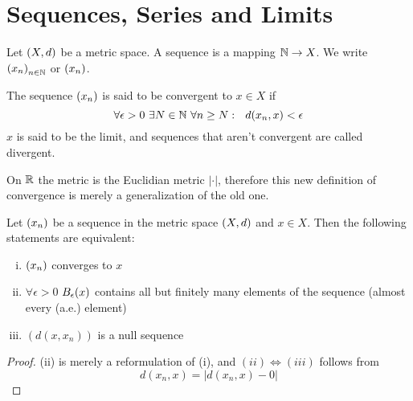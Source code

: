 \documentclass[../../script.tex] {subfiles}
\begin{document}
\section{Sequences, Series and Limits}

\begin{defi}
    Let $(X, d)$ be a metric space. A sequence is a mapping $\mathbb{N} \rightarrow X$. We write $\left(x_n\right)_{n \in \mathbb{N}}$ or $\left(x_n\right)$.

    The sequence $\left(x_n\right)$ is said to be convergent to $x \in X$ if
    \[
        \forall \epsilon > 0 ~\exists N \in \mathbb{N} ~\forall n \ge N: ~~d(x_n, x) < \epsilon
    \]
    $x$ is said to be the limit, and sequences that aren't convergent are called divergent.
\end{defi}

\begin{rem}
    On $\mathbb{R}$ the metric is the Euclidian metric $|\cdot|$, therefore this new definition of convergence is merely a generalization of the old one.
\end{rem}

\begin{thm}
    Let $\left(x_n\right)$ be a sequence in the metric space $(X, d)$ and $x \in X$. Then the following statements are equivalent:
    \begin{enumerate}[(i)]
        \item $\left(x_n\right)$ converges to $x$
        \item $\forall \epsilon > 0$ $B_{\epsilon}(x)$ contains all but finitely many elements of the sequence (almost every (a.e.) element)
        \item $(d(x, x_n))$ is a null sequence
    \end{enumerate}
\end{thm}
\begin{proof}
    (ii) is merely a reformulation of (i), and $(ii) \iff (iii)$ follows from
    \begin{equation}
        d(x_n, x) = |d(x_n, x) - 0|
    \end{equation}
\end{proof}
\end{document}
